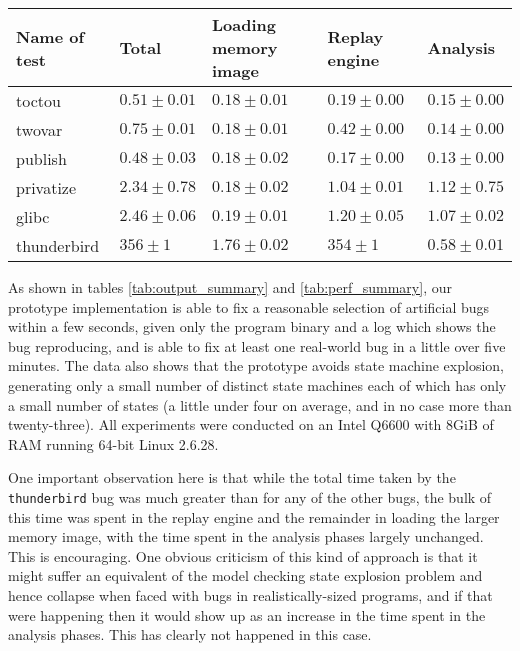 \documentclass[10pt,twocolumn,preprint,natbib,authoryear]{sigplanconf}
\begin{document}
\begin{table*}
\begin{tabular}{lllll}
Name of test & Total            & Loading memory image & Replay engine    & Analysis\\ \hline
toctou       & $ 0.51 \pm 0.01$ & $ 0.18 \pm 0.01$     & $ 0.19 \pm 0.00$ & $ 0.15 \pm 0.00$\\
twovar       & $ 0.75 \pm 0.01$ & $ 0.18 \pm 0.01$     & $ 0.42 \pm 0.00$ & $ 0.14 \pm 0.00$\\
publish      & $ 0.48 \pm 0.03$ & $ 0.18 \pm 0.02$     & $ 0.17 \pm 0.00$ & $ 0.13 \pm 0.00$\\
privatize    & $ 2.34 \pm 0.78$ & $ 0.18 \pm 0.02$     & $ 1.04 \pm 0.01$ & $ 1.12 \pm 0.75$\\
\hline
glibc        & $ 2.46 \pm 0.06$ & $ 0.19 \pm 0.01$     & $ 1.20 \pm 0.05$ & $ 1.07 \pm 0.02$\\
\hline
thunderbird  & $ 356  \pm 1$    & $ 1.76 \pm 0.02$     & $ 354  \pm 1$    & $ 0.58 \pm 0.01$\\
\end{tabular}
\caption{Time taken for the various phases of operation, in seconds.
  Mean and standard deviation of analysing a single reproduction five
  times.}
\label{tab:perf_summary}
\end{table*}

As shown in tables \ref{tab:output_summary} and
\ref{tab:perf_summary}, our prototype implementation is able to fix a
reasonable selection of artificial bugs within a few seconds, given
only the program binary and a log which shows the bug reproducing, and
is able to fix at least one real-world bug in a little over five
minutes.  The data also shows that the prototype avoids state machine
explosion, generating only a small number of distinct state machines
each of which has only a small number of states (a little under four
on average, and in no case more than twenty-three).  All experiments
were conducted on an Intel Q6600 with 8GiB of RAM running 64-bit Linux
2.6.28.

One important observation here is that while the total time taken by
the \verb|thunderbird| bug was much greater than for any of the other
bugs, the bulk of this time was spent in the replay engine and the
remainder in loading the larger memory image, with the time spent in
the analysis phases largely unchanged.  This is encouraging.  One
obvious criticism of this kind of approach is that it might suffer an
equivalent of the model checking state explosion problem and hence
collapse when faced with bugs in realistically-sized programs, and if
that were happening then it would show up as an increase in the time
spent in the analysis phases.  This has clearly not happened in this
case.
\end{document}
